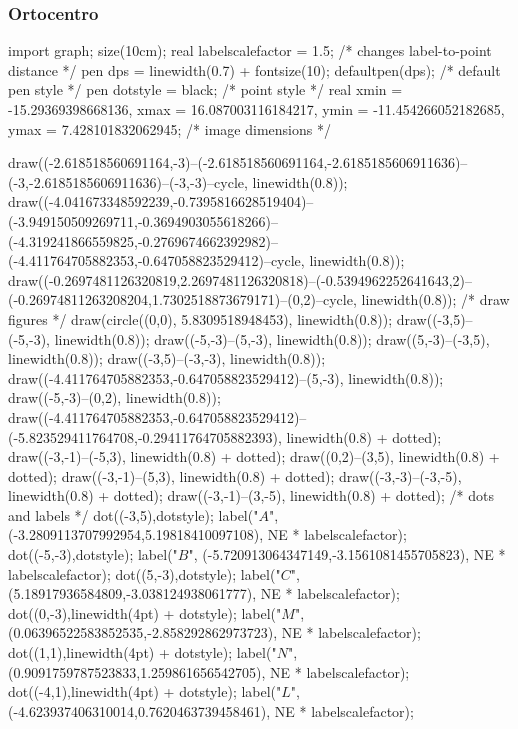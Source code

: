 \documentclass[11pt]{scrartcl}
\begin{document}
	\subsubsection{Ortocentro}
	\begin{center}
		\begin{asy}
			import graph; size(10cm); 
			real labelscalefactor = 1.5; /* changes label-to-point distance */
			pen dps = linewidth(0.7) + fontsize(10); defaultpen(dps); /* default pen style */ 
			pen dotstyle = black; /* point style */ 
			real xmin = -15.29369398668136, xmax = 16.087003116184217, ymin = -11.454266052182685, ymax = 7.428101832062945;  /* image dimensions */
			
			
			draw((-2.618518560691164,-3)--(-2.618518560691164,-2.6185185606911636)--(-3,-2.6185185606911636)--(-3,-3)--cycle, linewidth(0.8)); 
			draw((-4.041673348592239,-0.7395816628519404)--(-3.949150509269711,-0.3694903055618266)--(-4.319241866559825,-0.2769674662392982)--(-4.411764705882353,-0.647058823529412)--cycle, linewidth(0.8)); 
			draw((-0.2697481126320819,2.2697481126320818)--(-0.5394962252641643,2)--(-0.26974811263208204,1.7302518873679171)--(0,2)--cycle, linewidth(0.8)); 
			/* draw figures */
			draw(circle((0,0), 5.8309518948453), linewidth(0.8)); 
			draw((-3,5)--(-5,-3), linewidth(0.8)); 
			draw((-5,-3)--(5,-3), linewidth(0.8)); 
			draw((5,-3)--(-3,5), linewidth(0.8)); 
			draw((-3,5)--(-3,-3), linewidth(0.8)); 
			draw((-4.411764705882353,-0.647058823529412)--(5,-3), linewidth(0.8)); 
			draw((-5,-3)--(0,2), linewidth(0.8)); 
			draw((-4.411764705882353,-0.647058823529412)--(-5.823529411764708,-0.29411764705882393), linewidth(0.8) + dotted); 
			draw((-3,-1)--(-5,3), linewidth(0.8) + dotted); 
			draw((0,2)--(3,5), linewidth(0.8) + dotted); 
			draw((-3,-1)--(5,3), linewidth(0.8) + dotted); 
			draw((-3,-3)--(-3,-5), linewidth(0.8) + dotted); 
			draw((-3,-1)--(3,-5), linewidth(0.8) + dotted); 
			/* dots and labels */
			dot((-3,5),dotstyle); 
			label("$A$", (-3.2809113707992954,5.19818410097108), NE * labelscalefactor); 
			dot((-5,-3),dotstyle); 
			label("$B$", (-5.720913064347149,-3.1561081455705823), NE * labelscalefactor); 
			dot((5,-3),dotstyle); 
			label("$C$", (5.18917936584809,-3.038124938061777), NE * labelscalefactor); 
			dot((0,-3),linewidth(4pt) + dotstyle); 
			label("$M$", (0.06396522583852535,-2.858292862973723), NE * labelscalefactor); 
			dot((1,1),linewidth(4pt) + dotstyle); 
			label("$N$", (0.9091759787523833,1.259861656542705), NE * labelscalefactor); 
			dot((-4,1),linewidth(4pt) + dotstyle); 
			label("$L$", (-4.623937406310014,0.7620463739458461), NE * labelscalefactor); 

\end{asy}
\end{center}
\end{document}
